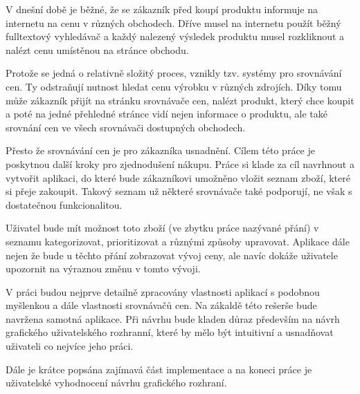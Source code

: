 \begin{introduction}
V dnešní době je běžné, že se zákazník před koupí produktu informuje na internetu na cenu v různých obchodech. Dříve musel na internetu použít běžný fulltextový vyhledávač a každý nalezený výsledek produktu musel rozkliknout a nalézt cenu umístěnou na stránce obchodu.

Protože se jedná o relativně složitý proces, vznikly tzv. systémy pro srovnávání cen. Ty odstraňují nutnost hledat cenu výrobku v různých zdrojích. Díky tomu může zákazník přijít na stránku srovnávače cen, nalézt produkt, který chce koupit a poté na jedné přehledné stránce vidí nejen informace o produktu, ale také srovnání cen ve všech srovnávači dostupných obchodech.

Přesto že srovnávání cen je pro zákazníka usnadnění. Cílem této práce je poskytnou další kroky pro zjednodušení nákupu. Práce si klade za cíl navrhnout a vytvořit aplikaci, do které bude zákazníkovi umožněno vložit seznam zboží, které si přeje zakoupit. Takový seznam už některé srovnávače také podporují, ne však s dostatečnou funkcionalitou.

Uživatel bude mít možnost toto zboží (ve zbytku práce nazývané přání) v seznamu kategorizovat, prioritizovat a různými způsoby upravovat. Aplikace dále nejen že bude u těchto přání zobrazovat vývoj ceny, ale navíc dokáže uživatele upozornit na výraznou změnu v tomto vývoji.

V práci budou nejprve detailně zpracovány vlastnosti aplikací s podobnou myšlenkou a dále vlastnosti srovnávačů cen. Na zákaldě této rešerše bude navržena samotná aplikace. Při návrhu bude kladen důraz především na návrh grafického uživatelského rozhranní, které by mělo být intuitivní a usnadňovat uživateli co nejvíce jeho práci.

Dále je krátce popsána zajímavá část implementace a na koneci práce je uživatelské vyhodnocení návrhu grafického rozhraní.
\end{introduction}
